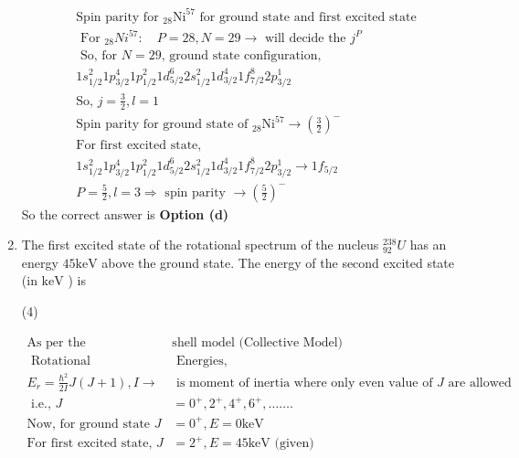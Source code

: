 \begin{enumerate}
	\begin{answer}
		\begin{align*}
		&\text{Spin parity for ${ }_{28} \mathrm{Ni}^{57}$ for ground state and first excited   state}\\
		&\text{ For ${ }_{28} N i^{57}: \quad P=28, N=29 \rightarrow$ will decide the $j^P$ }\\
		&\text{ So, for $N=29$, ground state configuration,}\\
		&\text{$1 s_{1 / 2}^2 1 p_{3 / 2}^4 1 p_{1 / 2}^2 1 d_{5 / 2}^6 2 s_{1 / 2}^2 1 d_{3 / 2}^4 1 f_{7 / 2}^8 2 p_{3 / 2}^1$}\\
		&\text{So, $j=\frac{3}{2}, l=1$}\\
		&\text{Spin parity for ground state of ${ }_{28} \mathrm{Ni}^{57} \rightarrow\left(\frac{3}{2}\right)^{-}$}\\
		&\text{For first excited state,}\\
		&1 s_{1 / 2}^2 1 p_{3 / 2}^4 1 p_{1 / 2}^2 1 d_{5 / 2}^6 2 s_{1 / 2}^2 1 d_{3 / 2}^4 1 f_{7 / 2}^8 2 p_{3 / 2}^1 \rightarrow 1 f_{5 / 2}\\
		&\text{$P=\frac{5}{2}, l=3 \Rightarrow$ spin parity $\rightarrow\left(\frac{5}{2}\right)^{-}$}
		\end{align*}
		So the correct answer is \textbf{Option (d)}
	\end{answer}
	\item  The first excited state of the rotational spectrum of the nucleus ${ }_{92}^{238} U$ has an energy $45 \mathrm{keV}$ above the ground state. The energy of the second excited state (in $\mathrm{keV}$ ) is
	{}
	\begin{tasks}(4)
	\end{tasks}
	\begin{answer}
		\begin{align*}
		\text{As per the }&\text{shell model (Collective Model)}\\
		\text{	Rotational}&\text{ Energies,}\\
		E_r=\frac{\hbar^2}{2 I} J(J+1), I \rightarrow&\text{ is moment of inertia where only even value of $J$ are allowed }\\
		\text{	i.e., }J&=0^{+}, 2^{+}, 4^{+}, 6^{+}, \ldots \ldots.\\
		\text{Now, for ground state }J&=0^{+}, E=0 \mathrm{keV}\\
		\text{For first excited state, }J&=2^{+}, E=45 \mathrm{keV}\text{ (given)}\\

\end{align*}
\end{answer}
\end{enumerate}
